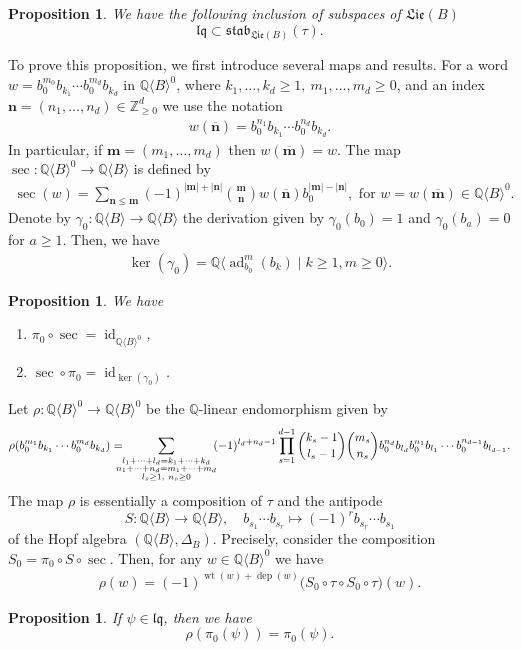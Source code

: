 \documentclass[11pt, a4paper]{amsart}
\newtheorem{proposition}[theorem]{Proposition}
\numberwithin{equation}{section}
\theoremstyle{definition}
\newcommand{\Q}{\mathbb{Q}}
\newcommand{\QB}{\Q\langle B\rangle}
\newcommand{\lqq}{\mathfrak{lq}}
\newcommand{\ad}{\operatorname{ad}}
\newcommand{\id}{\operatorname{id}}
\newcommand{\Lie}{\mathfrak{Lie}}
\newcommand{\stab}{\mathfrak{stab}}
\newcommand{\kernel}{\operatorname{ker}(\gamma_0)}
\begin{document}
\begin{proposition} \label{prop:lq_subset_stab}
We have the following inclusion of subspaces of $\Lie(B)$
\[
\lqq\subset \stab_{\Lie(B)}(\tau).
\]
\end{proposition}

To prove this proposition, we first introduce several maps and results.
For a word $w=b_0^{m_0}b_{k_1}\cdots b_0^{m_d}b_{k_d}$ in $\QB^0$, where $k_1,\ldots,k_d\geq1,\ m_1,\ldots,m_d\geq0$, and an index $\mathbf{n}=(n_1,\ldots,n_d)\in \mathbb{Z}_{\geq0}^d$ we use the notation
\begin{align*}
w(\overline{\mathbf{n}})=b_0^{n_1}b_{k_1}\cdots b_0^{n_d}b_{k_d}.
\end{align*}
In particular, if $\mathbf{m}=(m_1,\ldots,m_d)$ then $w(\overline{\mathbf{m}})=w$.
The map $\sec:\QB^0\to \QB$ is defined by 
\begin{align*}
\sec(w)=\sum_{\mathbf{n}\leq \mathbf{m}}(-1)^{|\mathbf{m}|+|\mathbf{n}|}\binom{\mathbf{m}}{\mathbf{n}} w(\overline{\mathbf{n}})b_0^{|\mathbf{m}|-|\mathbf{n}|}, \text{ for } w = w(\overline{\mathbf{m}}) \in \QB^0. 
\end{align*}
Denote by $\gamma_0:\QB\to\QB$ the derivation given by $\gamma_0(b_0)=1$ and $\gamma_0(b_a)=0$ for $a\geq1$. Then, we have
\begin{align*}
\kernel=\Q\langle \ad_{b_0}^m(b_k)\mid k\geq1,m\geq0\rangle.
\end{align*}

\begin{proposition} \label{prop:sec_pi0_inverse} \cite[Proposition 5.2]{Bu25} We have
\begin{enumerate}[leftmargin=*, label=(\alph*)]
    \item $\pi_0 \circ \sec = \id_{\QB^0}$,
    \item $\sec \circ \pi_0 = \id_{\kernel}$.
\end{enumerate}
\end{proposition}

Let $\rho : \QB^0 \to \QB^0$ be the $\Q$-linear endomorphism given by
\[\rho(b_0^{m_1}b_{k_1}\cdots b_0^{m_d}b_{k_d})=\hspace{-0.3cm}\sum_{\substack{l_1+\cdots+l_d=k_1+\cdots+k_d \\ n_1+\cdots+n_d=m_1+\cdots+m_d \\ l_s\geq1,\ n_s\geq0}} \hspace{-0.1cm} (-1)^{l_d+n_d-1}\prod_{s=1}^{d-1} \binom{k_s-1}{l_s-1}\binom{m_s}{n_s} b_0^{n_d}b_{l_d}b_0^{n_1}b_{l_1}\cdots b_0^{n_{d-1}}b_{l_{d-1}}.\]
The map $\rho$ is essentially a composition of $\tau$ and the antipode
\[S:\QB\to \QB,\quad b_{s_1}\cdots b_{s_r}\mapsto (-1)^r b_{s_r}\cdots b_{s_1}\]
of the Hopf algebra $(\QB,\Delta_B)$. Precisely, consider the composition $S_0=\pi_0\circ S\circ \sec$. Then, for any $w\in \QB^0$ we have
\begin{align*}
\rho(w)=(-1)^{\operatorname{wt}(w)+\operatorname{dep}(w)} \big(S_0\circ\tau\circ S_0\circ \tau\big)(w).
\end{align*}
\begin{proposition} \label{prop:lq_rho_inv} \cite[Proposition 5.4]{Bu25}
If $\psi\in\lqq$, then we have 
\[\rho(\pi_0(\psi))=\pi_0(\psi).\]
\end{proposition}
\end{document}

